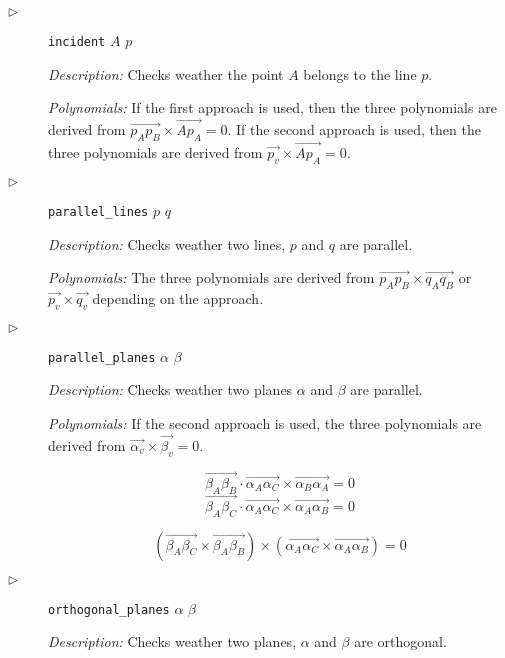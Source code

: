 \documentclass[final,1p,times,authoryear]{elsarticle}
\begin{document}
\begin{description}
\item[$\triangleright$] {\tt incident} $A$ $p$

{\em Description:} Checks weather the point $A$ belongs to the line
$p$.

{\em Polynomials:} If the first approach is used, then the three
polynomials are derived from
$\overrightarrow{p_Ap_B} \times \overrightarrow{Ap_A} = 0$. If the
second approach is used, then the three polynomials are derived from
$\overrightarrow{p_v} \times \overrightarrow{Ap_A} = 0.$

\item[$\triangleright$] {\tt parallel\_lines} $p$ $q$

{\em Description:} Checks weather two lines, $p$ and $q$ are parallel.

{\em Polynomials:} The three polynomials are derived from
$\overrightarrow{p_Ap_B} \times \overrightarrow{q_Aq_B}$ or
$\overrightarrow{p_v} \times \overrightarrow{q_v}$ depending on the
approach.

\item[$\triangleright$] {\tt parallel\_planes} $\alpha$ $\beta$

{\em Description:} Checks weather two planes $\alpha$ and $\beta$ are
parallel.

{\em Polynomials:} If the second approach is used, the three
polynomials are derived from
$\overrightarrow{\alpha_v} \times \overrightarrow{\beta_v} = 0.$



$$\overrightarrow{\beta_A\beta_B}\cdot \overrightarrow{\alpha_A\alpha_C} \times \overrightarrow{\alpha_B\alpha_A} = 0$$
$$\overrightarrow{\beta_A\beta_C}\cdot \overrightarrow{\alpha_A\alpha_C} \times \overrightarrow{\alpha_A\alpha_B} = 0$$

$$(\overrightarrow{\beta_A\beta_C}\times\overrightarrow{\beta_A\beta_B}) \times (\overrightarrow{\alpha_A\alpha_C} \times \overrightarrow{\alpha_A\alpha_B}) = 0$$


\item[$\triangleright$] {\tt orthogonal\_planes} $\alpha$ $\beta$

{\em Description:} Checks weather two planes, $\alpha$ and $\beta$ are
orthogonal.


\end{description}
\end{document}

